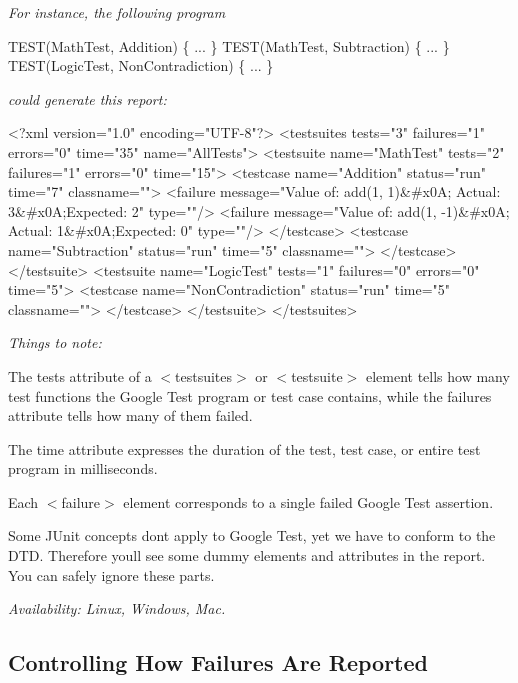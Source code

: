 {\itshape For instance, the following program}

{\itshape 
\begin{DoxyCode}
TEST(MathTest, Addition) \{ ... \}
TEST(MathTest, Subtraction) \{ ... \}
TEST(LogicTest, NonContradiction) \{ ... \}
\end{DoxyCode}
}

{\itshape could generate this report\+:}

{\itshape 
\begin{DoxyCode}
<?xml version="1.0" encoding="UTF-8"?>
<testsuites tests="3" failures="1" errors="0" time="35" name="AllTests">
  <testsuite name="MathTest" tests="2" failures="1" errors="0" time="15">
    <testcase name="Addition" status="run" time="7" classname="">
      <failure message="Value of: add(1, 1)&#x0A; Actual: 3&#x0A;Expected: 2" type=""/>
      <failure message="Value of: add(1, -1)&#x0A; Actual: 1&#x0A;Expected: 0" type=""/>
    </testcase>
    <testcase name="Subtraction" status="run" time="5" classname="">
    </testcase>
  </testsuite>
  <testsuite name="LogicTest" tests="1" failures="0" errors="0" time="5">
    <testcase name="NonContradiction" status="run" time="5" classname="">
    </testcase>
  </testsuite>
</testsuites>
\end{DoxyCode}
}

{\itshape Things to note\+:}

{\itshape 
\begin{DoxyItemize}
\item The {\ttfamily tests} attribute of a {\ttfamily $<$testsuites$>$} or {\ttfamily $<$testsuite$>$} element tells how many test functions the Google Test program or test case contains, while the {\ttfamily failures} attribute tells how many of them failed.
\item The {\ttfamily time} attribute expresses the duration of the test, test case, or entire test program in milliseconds.
\item Each {\ttfamily $<$failure$>$} element corresponds to a single failed Google Test assertion.
\item Some J\+Unit concepts don\textquotesingle{}t apply to Google Test, yet we have to conform to the D\+TD. Therefore you\textquotesingle{}ll see some dummy elements and attributes in the report. You can safely ignore these parts.
\end{DoxyItemize}}

{\itshape {\itshape Availability\+:} Linux, Windows, Mac.}

{\itshape \subsection*{Controlling How Failures Are Reported}}


